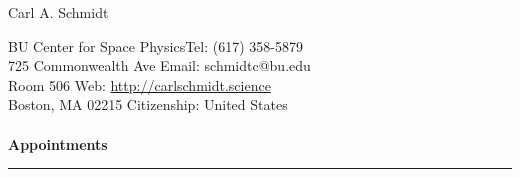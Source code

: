 \documentclass[12pt]{report}
\begin{document}
\newpage  
{\noindent}{\Large Carl A. Schmidt} \\ %
%
%

%
\thispagestyle{myheadings}

\noindent BU Center for Space Physics\hfill Tel: (617) 358-5879\\
725 Commonwealth Ave \hfill Email: schmidtc@bu.edu\\
Room 506 \hfill Web: \url{http://carlschmidt.science}\\
Boston, MA 02215 \hfill Citizenship: United States\\
\vspace{2 mm}\\
\bf{Appointments}\rm\\
\rule{\textwidth}{1pt}\\
\end{document}
